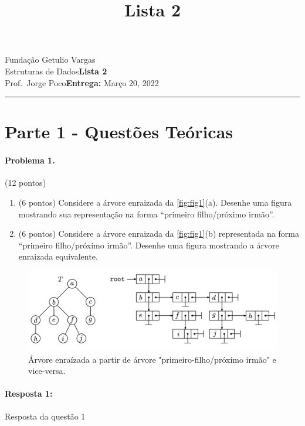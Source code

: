 \documentclass{article}
\title{Lista 2}
\date{}
\newcommand{\assignment}{Lista 2}
\newcommand{\duedate}{Março 20, 2022}
\begin{document}
Fundação Getulio Vargas\hfill\\
Estruturas de Dados\hfill\textbf{\assignment}\\
Prof.\ Jorge Poco\hfill\textbf{Entrega:} \duedate\\
\smallskip\hrule\bigskip

{\let\newpage\relax\maketitle}
\maketitle

\section*{Parte 1 - Questões Teóricas}

\paragraph{Problema 1.}(12 pontos)
\begin{enumerate}[label*=1.\arabic*.]
  \item (6 pontos) Considere a árvore enraizada da \autoref{fig:fig1}(a). Desenhe uma figura mostrando sua representação na forma “primeiro filho/próximo irmão”.
  \item (6 pontos) Considere a árvore enraizada da \autoref{fig:fig1}(b) representada na forma “primeiro filho/próximo irmão”. Desenhe uma figura mostrando a árvore enraizada equivalente.
\end{enumerate}

\begin{figure}[!h]
  \centering
    \includegraphics[width=.6\textwidth]{figures/fig1.png}
    \caption{Árvore enraízada a partir de árvore "primeiro-filho/próximo irmão" e vice-versa.}
  \label{fig:fig1}
\end{figure}


\paragraph{Resposta 1:} Resposta da questão 1
\end{document}

